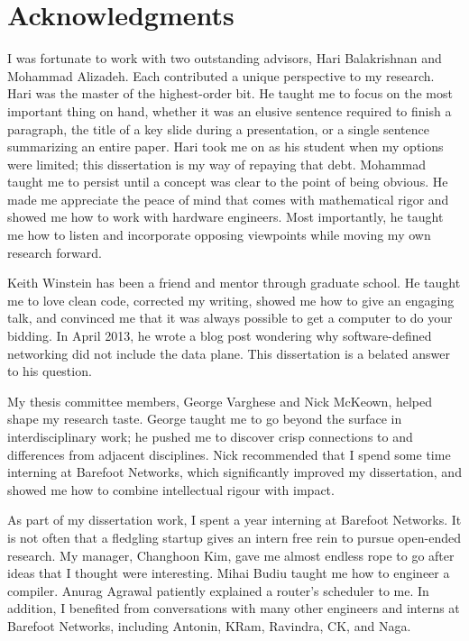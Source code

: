 \chapter*{Acknowledgments}
%

I was fortunate to work with two outstanding advisors, Hari Balakrishnan and
Mohammad Alizadeh. Each contributed a unique perspective to my research.  Hari
was the master of the highest-order bit. He taught me to focus on the most
important thing on hand, whether it was an elusive sentence required to finish
a paragraph, the title of a key slide during a presentation, or a single
sentence summarizing an entire paper. Hari took me on as his student when my
options were limited; this dissertation is my way of repaying that debt.
Mohammad taught me to persist until a concept was clear to the point of being
obvious. He made me appreciate the peace of mind that comes with mathematical
rigor and showed me how to work with hardware engineers.  Most importantly, he
taught me how to listen and incorporate opposing viewpoints while moving my own
research forward.

Keith Winstein has been a friend and mentor through graduate school. He taught
me to love clean code, corrected my writing, showed me how to give an engaging
talk, and convinced me that it was always possible to get a computer to do your
bidding. In April 2013, he wrote a blog post wondering why software-defined
networking did not include the data plane. This dissertation is a belated
answer to his question.

My thesis committee members, George Varghese and Nick McKeown, helped shape my
research taste. George taught me to go beyond the surface in interdisciplinary
work; he pushed me to discover crisp connections to and differences from adjacent
disciplines. Nick recommended that I spend some time interning at Barefoot
Networks, which significantly improved my dissertation, and showed me how to
combine intellectual rigour with impact.

As part of my dissertation work, I spent a year interning at Barefoot Networks.
It is not often that a fledgling startup gives an intern free rein to pursue
open-ended research. My manager, Changhoon Kim, gave me almost endless rope to
go after ideas that I thought were interesting. Mihai Budiu taught me how to
engineer a compiler. Anurag Agrawal patiently explained a router's scheduler to
me. In addition, I benefited from conversations with many other engineers and
interns at Barefoot Networks, including Antonin, KRam, Ravindra, CK, and Naga.

